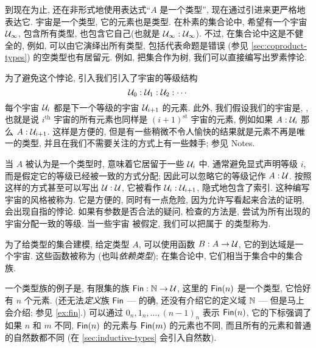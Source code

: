 到现在为止, 还在非形式地使用表达式``$A$ 是一个类型'', 现在通过引进来更严格地表达它.
%
%
宇宙是一个类型, 它的元素也是类型.
在朴素的集合论中, 希望有一个宇宙 $\mathcal{U}_\infty$, 包含所有类型, 也包含它自己(也就是 $\mathcal{U}_\infty : \mathcal{U}_\infty$).
不过, 在集合论中这是不健全的, 例如, 可以由它演绎出所有类型, 包括代表命题是错误 (参见 \cref{sec:coproduct-types}) 的空类型也有居留元.
例如, 把集合作为树, 我们可以直接编写出罗素悖论\cite{coquand:paradox}.

为了避免这个悖论, 引入我们引入了宇宙的等级结构
\[ \mathcal{U}_0 : \mathcal{U}_1 : \mathcal{U}_2 : \cdots \]
每个宇宙 $\mathcal{U}_i$ 都是下一个等级的宇宙 $\mathcal{U}_{i+1}$ 的元素.
此外, 我们假设我们的宇宙是,  , 也就是说 $i^{\mathrm{th}}$ 宇宙的所有元素也同样是 $(i+1)^{\mathrm{st}}$ 宇宙的元素, 例如如果 $A:\mathcal{U}_i$ 那么 $A:\mathcal{U}_{i+1}$.
这样是方便的, 但是有一些稍微不令人愉快的结果就是元素不再是唯一的类型, 并且在我们不需要关注的方式上有一些棘手;
参见 Notes.

当 $A$ 被认为是一个类型时, 意味着它居留于一些 $\mathcal{U}_i$ 中.
通常避免显式声明等级
%
%
%
$i$, 而是假定它的等级已经被一致的方式分配;
因此可以忽略它的等级记作 $A:\mathcal{U}$.
按照这样的方式甚至可以写出 $\mathcal{U}:\mathcal{U}$, 它被看作 $\mathcal{U}_i:\mathcal{U}_{i+1}$, 隐式地包含了索引.
这种编写宇宙的风格被称为.
它是方便的, 同时有一点危险, 因为允许写看起来合法的证明, 会出现自指的悖论.
如果有参数是否合法的疑问, 检查的方法是, 尝试为所有出现的宇宙分配一致的等级.
当一些宇宙 \UU 被假定, 我们可以把属于 \UU 的类型称为.
%
%


为了给类型的集合建模, 给定类型 $A$, 可以使用函数 $B : A \to \mathcal{U}$, 它的到达域是一个宇宙.
这些函数被称为
%
(也叫\emph{依赖类型});
%
%
%
%
在集合论中, 它们相当于集合中的集合族.


一个类型族的例子是, 有限集的族 $\mathsf{Fin} : \mathbb{N} \to \mathcal{U}$, 这里的 $\mathsf{Fin}(n)$ 是一个类型, 它恰好有 $n$ 个元素.
(还无法\emph{定义}族 $\mathsf{Fin}$ --- 的确, 还没有介绍它的定义域 $\mathbb{N}$ --- 但是马上会介绍; 参见 \cref{ex:fin}.)
可以通过 $0_n,1_n,\dots,(n-1)_n$ 表示 $\mathsf{Fin}(n)$, 它的下标强调了如果 $n$ 和 $m$ 不同,  $\mathsf{Fin}(n)$ 的元素与 $\mathsf{Fin}(m)$ 的元素也不同, 而且所有的元素和普通的自然数都不同 (在 \cref{sec:inductive-types} 会引入自然数).
%



